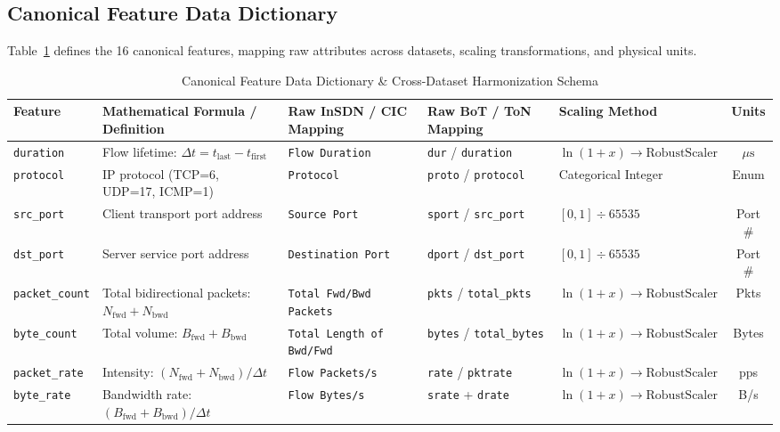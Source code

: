 \documentclass[journal]{IEEEtran}
\begin{document}
\subsection{Canonical Feature Data Dictionary}
Table~\ref{tab:feature_dictionary} defines the 16 canonical features, mapping raw attributes across datasets, scaling transformations, and physical units.

\begin{table}[t]
\centering
\caption{Canonical Feature Data Dictionary \& Cross-Dataset Harmonization Schema}
\label{tab:feature_dictionary}
\begin{tabular}{lllllc}
\toprule
\textbf{Feature} & \textbf{Mathematical Formula / Definition} & \textbf{Raw InSDN / CIC Mapping} & \textbf{Raw BoT / ToN Mapping} & \textbf{Scaling Method} & \textbf{Units} \\
\midrule
\texttt{duration} & Flow lifetime: $\Delta t = t_{\text{last}} - t_{\text{first}}$ & \texttt{Flow Duration} & \texttt{dur} / \texttt{duration} & $\ln(1 + x) \to \text{RobustScaler}$ & $\mu\text{s}$ \\
\texttt{protocol} & IP protocol (TCP=6, UDP=17, ICMP=1) & \texttt{Protocol} & \texttt{proto} / \texttt{protocol} & Categorical Integer & Enum \\
\texttt{src\_port} & Client transport port address & \texttt{Source Port} & \texttt{sport} / \texttt{src\_port} & $[0, 1] \div 65535$ & Port \# \\
\texttt{dst\_port} & Server service port address & \texttt{Destination Port} & \texttt{dport} / \texttt{dst\_port} & $[0, 1] \div 65535$ & Port \# \\
\texttt{packet\_count} & Total bidirectional packets: $N_{\text{fwd}} + N_{\text{bwd}}$ & \texttt{Total Fwd/Bwd Packets} & \texttt{pkts} / \texttt{total\_pkts} & $\ln(1 + x) \to \text{RobustScaler}$ & Pkts \\
\texttt{byte\_count} & Total volume: $B_{\text{fwd}} + B_{\text{bwd}}$ & \texttt{Total Length of Bwd/Fwd} & \texttt{bytes} / \texttt{total\_bytes} & $\ln(1 + x) \to \text{RobustScaler}$ & Bytes \\
\texttt{packet\_rate} & Intensity: $(N_{\text{fwd}} + N_{\text{bwd}}) / \Delta t$ & \texttt{Flow Packets/s} & \texttt{rate} / \texttt{pktrate} & $\ln(1 + x) \to \text{RobustScaler}$ & pps \\
\texttt{byte\_rate} & Bandwidth rate: $(B_{\text{fwd}} + B_{\text{bwd}}) / \Delta t$ & \texttt{Flow Bytes/s} & \texttt{srate} + \texttt{drate} & $\ln(1 + x) \to \text{RobustScaler}$ & B/s \\

\end{tabular}
\end{table}
\end{document}
